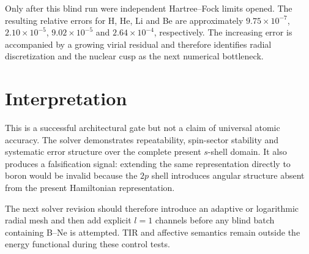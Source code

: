 Only after this blind run were independent Hartree--Fock limits opened. The resulting relative errors for H, He, Li and Be are approximately $9.75\times10^{-7}$, $2.10\times10^{-5}$, $9.02\times10^{-5}$ and $2.64\times10^{-4}$, respectively. The increasing error is accompanied by a growing virial residual and therefore identifies radial discretization and the nuclear cusp as the next numerical bottleneck.

\section{Interpretation}
This is a successful architectural gate but not a claim of universal atomic accuracy. The solver demonstrates repeatability, spin-sector stability and systematic error structure over the complete present $s$-shell domain. It also produces a falsification signal: extending the same representation directly to boron would be invalid because the $2p$ shell introduces angular structure absent from the present Hamiltonian representation.

The next solver revision should therefore introduce an adaptive or logarithmic radial mesh and then add explicit $l=1$ channels before any blind batch containing B--Ne is attempted. TIR and affective semantics remain outside the energy functional during these control tests.
